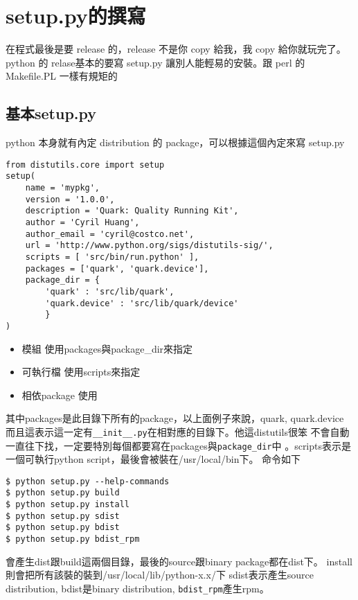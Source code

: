 
\section{setup.py的撰寫}
在程式最後是要 release 的，release 不是你 copy 給我，我 copy 給你就玩完了。python 的
relase基本的要寫 setup.py 讓別人能輕易的安裝。跟 perl 的 Makefile.PL 一樣有規矩的

\subsection{基本setup.py}
python 本身就有內定 distribution 的 package，可以根據這個內定來寫 setup.py
\begin{verbatim}
from distutils.core import setup
setup(
    name = 'mypkg',
    version = '1.0.0',
    description = 'Quark: Quality Running Kit',
    author = 'Cyril Huang',
    author_email = 'cyril@costco.net',
    url = 'http://www.python.org/sigs/distutils-sig/',
    scripts = [ 'src/bin/run.python' ],
    packages = ['quark', 'quark.device'],
    package_dir = {
        'quark' : 'src/lib/quark',
        'quark.device' : 'src/lib/quark/device'
        }
)
\end{verbatim}

\begin{itemize}
  \item 模組 使用packages與package\_dir來指定
  \item 可執行檔 使用scripts來指定
  \item 相依package 使用
\end{itemize}
其中packages是此目錄下所有的package，以上面例子來說，quark, quark.device
而且這表示這一定有\verb=__init__.py=在相對應的目錄下。他這distutils很笨
不會自動一直往下找，一定要特別每個都要寫在packages與\verb=package_dir=中
。scripts表示是一個可執行python script，最後會被裝在/usr/local/bin下。
命令如下
\begin{verbatim}
$ python setup.py --help-commands
$ python setup.py build
$ python setup.py install
$ python setup.py sdist
$ python setup.py bdist
$ python setup.py bdist_rpm
\end{verbatim}
會產生dist跟build這兩個目錄，最後的source跟binary package都在dist下。
install則會把所有該裝的裝到/usr/local/lib/python-x.x/下
sdist表示產生source distribution, bdist是binary distribution,
\verb=bdist_rpm=產生rpm。

